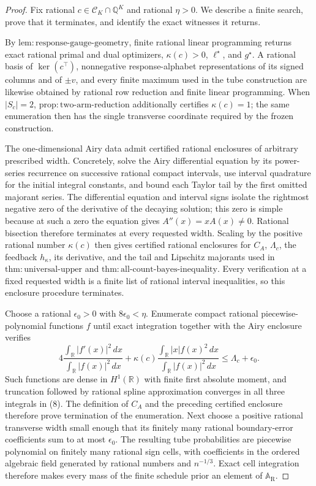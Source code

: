 \documentclass{article}
\begin{document}
\begin{proof}
Fix rational \(c\in\mathcal C_K\cap\mathbb Q^K\) and rational \(\eta>0\).  We describe a finite search, prove that it terminates, and identify the exact witnesses it returns.

By \(\mathrm{lem:response\text{-}gauge\text{-}geometry}\), finite rational linear programming returns exact rational primal and dual optimizers, \(\kappa(c)>0\), \(\ell^\star\), and \(g^\star\).  A rational basis of \(\ker(c^\top)\), nonnegative response-alphabet representations of its signed columns and of \(\pm v\), and every finite maximum used in the tube construction are likewise obtained by rational row reduction and finite linear programming.  When \(|S_c|=2\), \(\mathrm{prop:two\text{-}arm\text{-}reduction}\) additionally certifies \(\kappa(c)=1\); the same enumeration then has the single transverse coordinate required by the frozen construction.

The one-dimensional Airy data admit certified rational enclosures of arbitrary prescribed width.  Concretely, solve the Airy differential equation by its power-series recurrence on successive rational compact intervals, use interval quadrature for the initial integral constants, and bound each Taylor tail by the first omitted majorant series.  The differential equation and interval signs isolate the rightmost negative zero of the derivative of the decaying solution; this zero is simple because at such a zero the equation gives \(A''(x)=xA(x)\ne0\).  Rational bisection therefore terminates at every requested width.  Scaling by the positive rational number \(\kappa(c)\) then gives certified rational enclosures for \(C_A\), \(\Lambda_c\), the feedback \(h_\kappa\), its derivative, and the tail and Lipschitz majorants used in \(\mathrm{thm:universal\text{-}upper}\) and \(\mathrm{thm:all\text{-}count\text{-}bayes\text{-}inequality}\).  Every verification at a fixed requested width is a finite list of rational interval inequalities, so this enclosure procedure terminates.

Choose a rational \(\epsilon_0>0\) with \(8\epsilon_0<\eta\).  Enumerate compact rational piecewise-polynomial functions \(f\) until exact integration together with the Airy enclosure verifies
\[
4\frac{\int_{\mathbb R}|f'(x)|^2\,dx}{\int_{\mathbb R}|f(x)|^2\,dx}
+\kappa(c)\frac{\int_{\mathbb R}|x|f(x)^2\,dx}{\int_{\mathbb R}|f(x)|^2\,dx}
\le \Lambda_c+\epsilon_0.
\tag{8}
\]
Such functions are dense in \(H^1(\mathbb R)\) with finite first absolute moment, and truncation followed by rational spline approximation converges in all three integrals in (8).  The definition of \(C_A\) and the preceding certified enclosure therefore prove termination of the enumeration.  Next choose a positive rational transverse width small enough that its finitely many rational boundary-error coefficients sum to at most \(\epsilon_0\).  The resulting tube probabilities are piecewise polynomial on finitely many rational sign cells, with coefficients in the ordered algebraic field generated by rational numbers and \(n^{-1/3}\).  Exact cell integration therefore makes every mass of the finite schedule prior an element of \(\mathbb A_{\mathrm R}\).


\end{proof}
\end{document}
